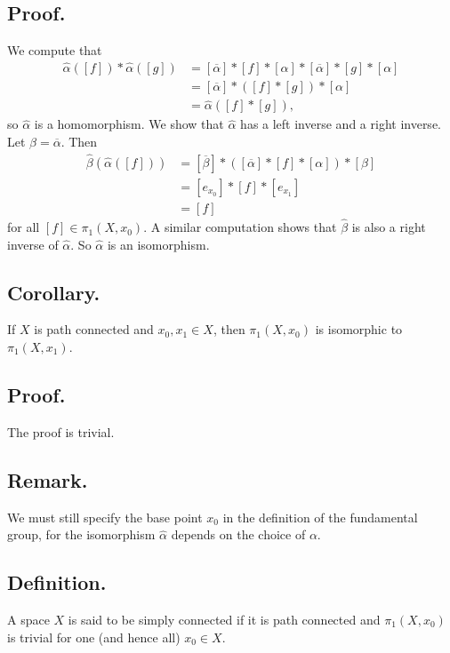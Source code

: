 \documentclass[titlepage]{article}
\begin{document}
\subsection{Proof.} We compute that 
\begin{align*}
    \hat{\alpha}([f]) * \hat{\alpha}([g]) &= [\overline{\alpha}] * [f] * [\alpha] * [\overline{\alpha}] * [g] * [\alpha] \\
                                          &= [\overline{\alpha}] * ([f] * [g]) * [\alpha] \\
                                          &= \hat{\alpha}([f] * [g]),
\end{align*}
so $\hat{\alpha}$ is a homomorphism. We show that $\hat{\alpha}$ has a left inverse and a right inverse. Let $\beta = \overline{\alpha}$. Then 
\begin{align*}
    \hat{\beta}(\hat{\alpha}([f])) &= [\overline{\beta}] * ([\overline{\alpha}] * [f] * [\alpha]) * [\beta] \\
                                   &= [e_{x_{0}}] * [f] * [e_{x_{1}}] \\
                                   &= [f]
\end{align*}
for all $[f] \in \pi_{1}(X, x_{0})$. A similar computation shows that $\hat{\beta}$ is also a right inverse of $\hat{\alpha}$. So $\hat{\alpha}$ is an isomorphism.

\subsection{Corollary.} If $X$ is path connected and $x_{0}, x_{1} \in X$, then $\pi_{1}(X, x_{0})$ is isomorphic to $\pi_{1}(X, x_{1})$.

\subsection{Proof.} The proof is trivial.

\subsection{Remark.} We must still specify the base point $x_{0}$ in the definition of the fundamental group, for the isomorphism $\hat{\alpha}$ depends on the choice of $\alpha$.

\subsection{Definition.} A space $X$ is said to be simply connected if it is path connected and $\pi_{1}(X, x_{0})$ is trivial for one (and hence all) $x_{0} \in X$.
\end{document}
